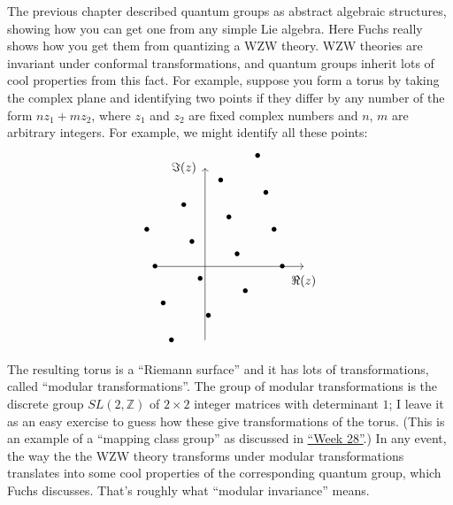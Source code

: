 \documentclass{article}
\begin{document}
\begin{enumerate}
  The previous chapter described quantum groups as abstract algebraic
  structures, showing how you can get one from any simple Lie algebra.
  Here Fuchs really shows how you get them from quantizing a WZW theory.
  WZW theories are invariant under conformal transformations, and
  quantum groups inherit lots of cool properties from this fact. For
  example, suppose you form a torus by taking the complex plane and
  identifying two points if they differ by any number of the form
  \(n z_1 + m z_2\), where \(z_1\) and \(z_2\) are fixed complex numbers
  and \(n\), \(m\) are arbitrary integers. For example, we might
  identify all these points: \[
     \begin{tikzpicture}[scale=0.7]
       \draw[->] (-2,0) to (4,0) node[label=below:{$\Re(z)$}]{};
       \draw[->] (0,-3) to (0,4) node[label=left:{$\Im(z)$}]{};
       \foreach \m in {-1,0,1,2}
       {
         \foreach \n in {-1,0,1,2}
         {
           \node at ({\m*1.5-\n/3-0.2},{1.5*\n+\m-0.5}) {$\bullet$};
         }
       }
     \end{tikzpicture}
   \] The resulting torus is a ``Riemann surface'' and it has lots of
  transformations, called ``modular transformations''. The group of
  modular transformations is the discrete group \(SL(2,\mathbb{Z})\) of
  \(2\times2\) integer matrices with determinant \(1\); I leave it as an
  easy exercise to guess how these give transformations of the torus.
  (This is an example of a ``mapping class group'' as discussed in
  \protect\hyperlink{week28}{``Week 28''}.) In any event, the way the
  the WZW theory transforms under modular transformations translates
  into some cool properties of the corresponding quantum group, which
  Fuchs discusses. That's roughly what ``modular invariance'' means.


\end{enumerate}
\end{document}
